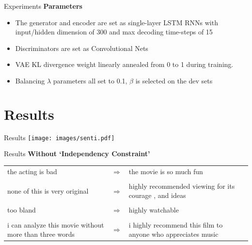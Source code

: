 \documentclass{beamer}
\begin{document}
\begin{frame}{Experiments}
  \textbf{Parameters}
  \begin{itemize}
    \item The generator and encoder are set as single-layer LSTM RNNs with input/hidden dimension of 300 and max decoding time-steps of 15
    \item Discriminators are set as Convolutional Nets
    \item VAE KL divergence weight linearly annealed from 0 to 1 during training.
    \item Balancing $\lambda$ parameters all set to 0.1, $\beta$ is selected on the dev sets
  \end{itemize}
\end{frame}

\section{Results}
\begin{frame}{Results}
  \centering
  \texttt{[image: images/senti.pdf]}
\end{frame}

\begin{frame}{Results}
  \centering
  \textbf{Without `Independency Constraint'} \\
  \vspace{1cm}
  \small
  \begin{tabular}{ p{.4\linewidth} p{.05\linewidth} p{.4\linewidth} }
    the acting is bad & $\Rightarrow$ & the movie is so much fun \\ \\ 
    none of this is very original & $\Rightarrow$ & highly recommended viewing for its courage , and ideas \\ \\
    too bland & $\Rightarrow$ & highly watchable \\ \\
    i can analyze this movie without more than three words & $\Rightarrow$ & i highly recommend this film to anyone who appreciates music
  \end{tabular}
\end{frame}
\end{document}
